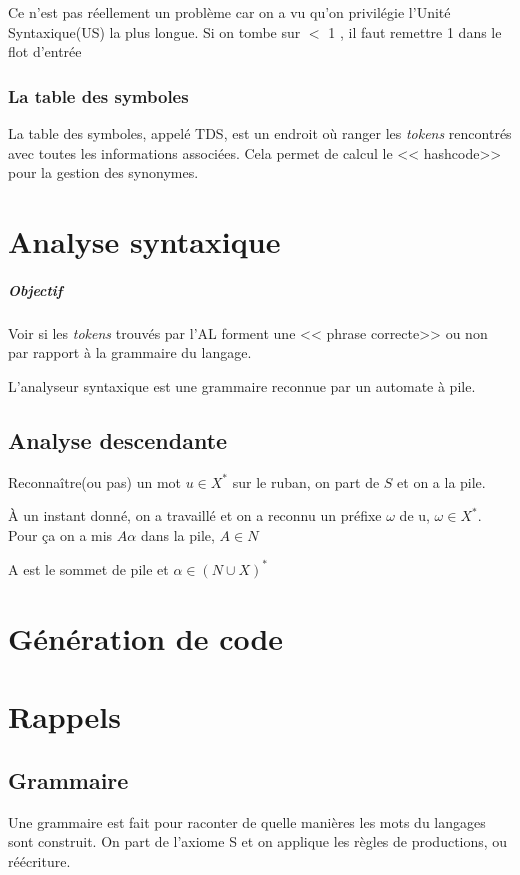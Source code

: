 \documentclass[12pt,a4paper,openany]{book}
\newcommand{\tokens}{\textit{tokens} }
\begin{document}
	Ce n'est pas réellement un problème car on a vu qu'on privilégie l'Unité Syntaxique(US) la plus longue.
	Si on tombe sur $<$ 1 , il faut remettre 1 dans le flot d’entrée

	\subsection{La table des symboles}
	La table des symboles, appelé TDS, est un endroit où ranger les \tokens rencontrés avec toutes les informations associées. Cela permet de calcul le <<
	hashcode>> pour la gestion des synonymes.

	\chapter{Analyse syntaxique}
	\paragraph{Objectif} Voir si les \tokens trouvés par l'AL forment une << phrase correcte>> ou non par rapport à la grammaire du langage.

	L'analyseur syntaxique est une grammaire reconnue par un automate à pile.

	\section{Analyse descendante}
Reconnaître(ou pas) un mot $u \in X^*$ sur le ruban, on part de $S$ et on a la pile.

À un instant donné, on a travaillé et on a reconnu un préfixe $\omega$ de u, $\omega \in X^*$.
Pour ça on a mis $A\alpha$ dans la pile, $A \in N$

A est le sommet de pile et $\alpha \in (N \cup X)^*$
	\chapter{Génération de code}

	\appendix
	\chapter{Rappels}
	\section{Grammaire}
	Une grammaire est fait pour raconter de quelle manières les mots du langages sont construit. On part de l'axiome S et on applique les règles de
	productions, ou réécriture.
\end{document}
